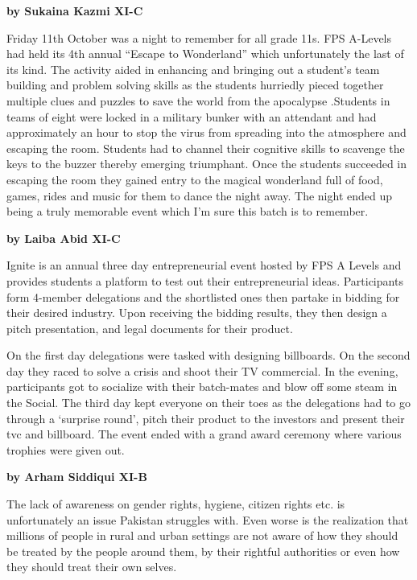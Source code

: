 \documentclass{article}
\begin{document}
\begin{multicols}{2}

\textbf{by Sukaina Kazmi XI-C}

Friday 11th October was a night to remember for all grade 11s. FPS A-Levels had held its 4th annual “Escape to Wonderland” which unfortunately the last of its kind. The activity aided in enhancing and bringing out a student’s team building and problem solving skills as the students hurriedly pieced together multiple clues and puzzles to save the world from the apocalypse .Students in teams of eight were locked in a military bunker with an attendant and had approximately an hour to stop the virus from spreading into the atmosphere and escaping the room. Students had to channel their cognitive skills to scavenge the keys to the buzzer thereby emerging triumphant. Once the students succeeded in escaping the room they gained entry to the magical wonderland full of food, games, rides and music for them to dance the night away. The night ended up being a truly memorable event which I’m sure this batch is to remember.


\textbf{by Laiba Abid XI-C}

Ignite is an annual three day entrepreneurial event hosted by FPS A Levels and provides students a platform to test out their entrepreneurial ideas. Participants form 4-member delegations and the shortlisted ones then partake in bidding for their desired industry. Upon receiving the bidding results, they then design a pitch presentation, and legal documents for their product. 

On the first day delegations were tasked with designing billboards. On the second day they raced to solve a crisis and shoot their TV commercial. In the evening, participants got to socialize with their batch-mates and blow off some steam in the Social. The third day kept everyone on their toes as the delegations had to go through a ‘surprise round’, pitch their product to the investors and present their tvc and billboard. The event ended with a grand award ceremony where various trophies were given out.

\end{multicols}
\pagebreak 


\textbf{by Arham Siddiqui XI-B}

The lack of awareness on gender rights, hygiene, citizen rights etc. is unfortunately an issue Pakistan struggles with. Even worse is the realization that millions of people in rural and urban settings are not aware of how they should be treated by the people around them, by their rightful authorities or even how they should treat their own selves. 
\end{document}
